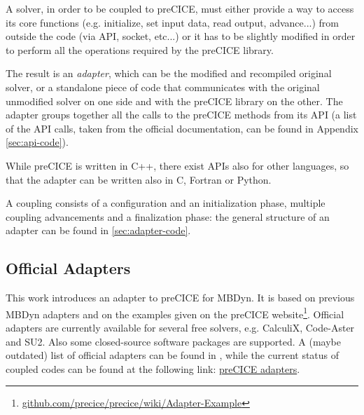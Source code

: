 A solver, in order to be coupled to preCICE, must either provide a way to access its core functions (e.g. initialize, set input data, read output, advance...) from outside the code (via API, socket, etc...) or it has to be slightly modified in order to perform all the operations required by the preCICE library.

The result is an \textit{adapter}, which can be the modified and recompiled original solver, or a standalone piece of code that communicates with the original unmodified solver on one side and with the preCICE library on the other. The adapter groups together all the calls to the preCICE methods from its API (a list of the API calls, taken from the official documentation, can be found in Appendix \ref{sec:api-code}).

While preCICE is written in C++, there exist APIs also for other languages, so that the adapter can be written also in C, Fortran or Python.

A coupling consists of a configuration and an initialization phase, multiple coupling advancements and a finalization phase: the general structure of an adapter can be found in \ref{sec:adapter-code}.


\subsection{Official Adapters}
\label{sec:pc-adapters}


This work introduces an adapter to preCICE for MBDyn. It is based on previous MBDyn adapters and on the examples given on the preCICE website\footnote{\href{https://github.com/precice/precice/wiki/Adapter-Example}{github.com/precice/precice/wiki/Adapter-Example}}.
Official adapters are currently available for several free solvers, e.g. CalculiX, Code-Aster and SU2. Also some closed-source software packages are supported. A (maybe outdated) list of official adapters can be found in \cite{uekermann2017official}, while the current status of coupled codes can be found at the following link: \href{https://www.precice.org/codes/}{preCICE adapters}.


